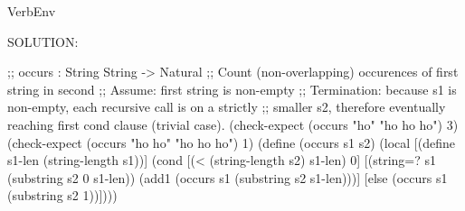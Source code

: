\documentclass[12pt]{article}
\begin{document}
\begin{SaveVerbatim}{VerbEnv}


SOLUTION:

;; occurs : String String -> Natural
;; Count (non-overlapping) occurences of first string in second
;; Assume: first string is non-empty
;; Termination: because s1 is non-empty, each recursive call is on a strictly
;; smaller s2, therefore eventually reaching first cond clause (trivial case).
(check-expect (occurs "ho" "ho ho ho") 3)
(check-expect (occurs "ho ho" "ho ho ho") 1)
(define (occurs s1 s2)
  (local [(define s1-len (string-length s1))]
    (cond [(< (string-length s2) s1-len) 0]
          [(string=? s1 (substring s2 0 s1-len))
           (add1 (occurs s1 (substring s2 s1-len)))]
          [else
           (occurs s1 (substring s2 1))])))
\end{SaveVerbatim}







\end{document}

